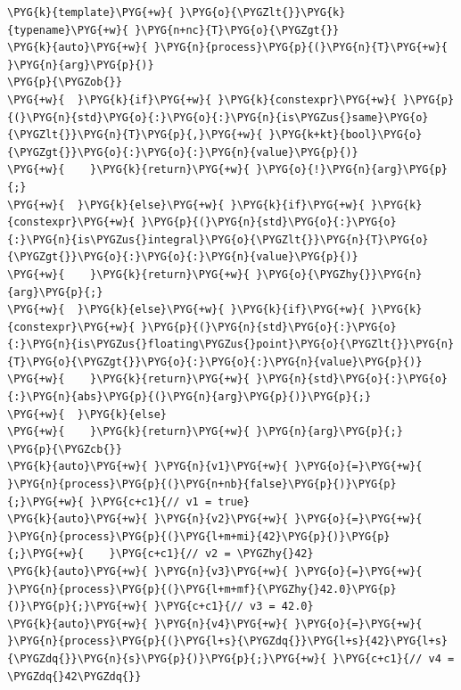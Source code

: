 \begin{itemize}
\begin{codeblockbg}
\begin{Verbatim}[commandchars=\\\{\},breaklines=true,breakanywhere=true,fontsize=\codefont,xleftmargin=17bp]
\PYG{k}{template}\PYG{+w}{ }\PYG{o}{\PYGZlt{}}\PYG{k}{typename}\PYG{+w}{ }\PYG{n+nc}{T}\PYG{o}{\PYGZgt{}}
\PYG{k}{auto}\PYG{+w}{ }\PYG{n}{process}\PYG{p}{(}\PYG{n}{T}\PYG{+w}{ }\PYG{n}{arg}\PYG{p}{)}
\PYG{p}{\PYGZob{}}
\PYG{+w}{  }\PYG{k}{if}\PYG{+w}{ }\PYG{k}{constexpr}\PYG{+w}{ }\PYG{p}{(}\PYG{n}{std}\PYG{o}{:}\PYG{o}{:}\PYG{n}{is\PYGZus{}same}\PYG{o}{\PYGZlt{}}\PYG{n}{T}\PYG{p}{,}\PYG{+w}{ }\PYG{k+kt}{bool}\PYG{o}{\PYGZgt{}}\PYG{o}{:}\PYG{o}{:}\PYG{n}{value}\PYG{p}{)}
\PYG{+w}{    }\PYG{k}{return}\PYG{+w}{ }\PYG{o}{!}\PYG{n}{arg}\PYG{p}{;}
\PYG{+w}{  }\PYG{k}{else}\PYG{+w}{ }\PYG{k}{if}\PYG{+w}{ }\PYG{k}{constexpr}\PYG{+w}{ }\PYG{p}{(}\PYG{n}{std}\PYG{o}{:}\PYG{o}{:}\PYG{n}{is\PYGZus{}integral}\PYG{o}{\PYGZlt{}}\PYG{n}{T}\PYG{o}{\PYGZgt{}}\PYG{o}{:}\PYG{o}{:}\PYG{n}{value}\PYG{p}{)}
\PYG{+w}{    }\PYG{k}{return}\PYG{+w}{ }\PYG{o}{\PYGZhy{}}\PYG{n}{arg}\PYG{p}{;}
\PYG{+w}{  }\PYG{k}{else}\PYG{+w}{ }\PYG{k}{if}\PYG{+w}{ }\PYG{k}{constexpr}\PYG{+w}{ }\PYG{p}{(}\PYG{n}{std}\PYG{o}{:}\PYG{o}{:}\PYG{n}{is\PYGZus{}floating\PYGZus{}point}\PYG{o}{\PYGZlt{}}\PYG{n}{T}\PYG{o}{\PYGZgt{}}\PYG{o}{:}\PYG{o}{:}\PYG{n}{value}\PYG{p}{)}
\PYG{+w}{    }\PYG{k}{return}\PYG{+w}{ }\PYG{n}{std}\PYG{o}{:}\PYG{o}{:}\PYG{n}{abs}\PYG{p}{(}\PYG{n}{arg}\PYG{p}{)}\PYG{p}{;}
\PYG{+w}{  }\PYG{k}{else}
\PYG{+w}{    }\PYG{k}{return}\PYG{+w}{ }\PYG{n}{arg}\PYG{p}{;}
\PYG{p}{\PYGZcb{}}
\PYG{k}{auto}\PYG{+w}{ }\PYG{n}{v1}\PYG{+w}{ }\PYG{o}{=}\PYG{+w}{ }\PYG{n}{process}\PYG{p}{(}\PYG{n+nb}{false}\PYG{p}{)}\PYG{p}{;}\PYG{+w}{ }\PYG{c+c1}{// v1 = true}
\PYG{k}{auto}\PYG{+w}{ }\PYG{n}{v2}\PYG{+w}{ }\PYG{o}{=}\PYG{+w}{ }\PYG{n}{process}\PYG{p}{(}\PYG{l+m+mi}{42}\PYG{p}{)}\PYG{p}{;}\PYG{+w}{    }\PYG{c+c1}{// v2 = \PYGZhy{}42}
\PYG{k}{auto}\PYG{+w}{ }\PYG{n}{v3}\PYG{+w}{ }\PYG{o}{=}\PYG{+w}{ }\PYG{n}{process}\PYG{p}{(}\PYG{l+m+mf}{\PYGZhy{}42.0}\PYG{p}{)}\PYG{p}{;}\PYG{+w}{ }\PYG{c+c1}{// v3 = 42.0}
\PYG{k}{auto}\PYG{+w}{ }\PYG{n}{v4}\PYG{+w}{ }\PYG{o}{=}\PYG{+w}{ }\PYG{n}{process}\PYG{p}{(}\PYG{l+s}{\PYGZdq{}}\PYG{l+s}{42}\PYG{l+s}{\PYGZdq{}}\PYG{n}{s}\PYG{p}{)}\PYG{p}{;}\PYG{+w}{ }\PYG{c+c1}{// v4 = \PYGZdq{}42\PYGZdq{}}
\end{Verbatim}
\end{codeblockbg}


\end{itemize}


